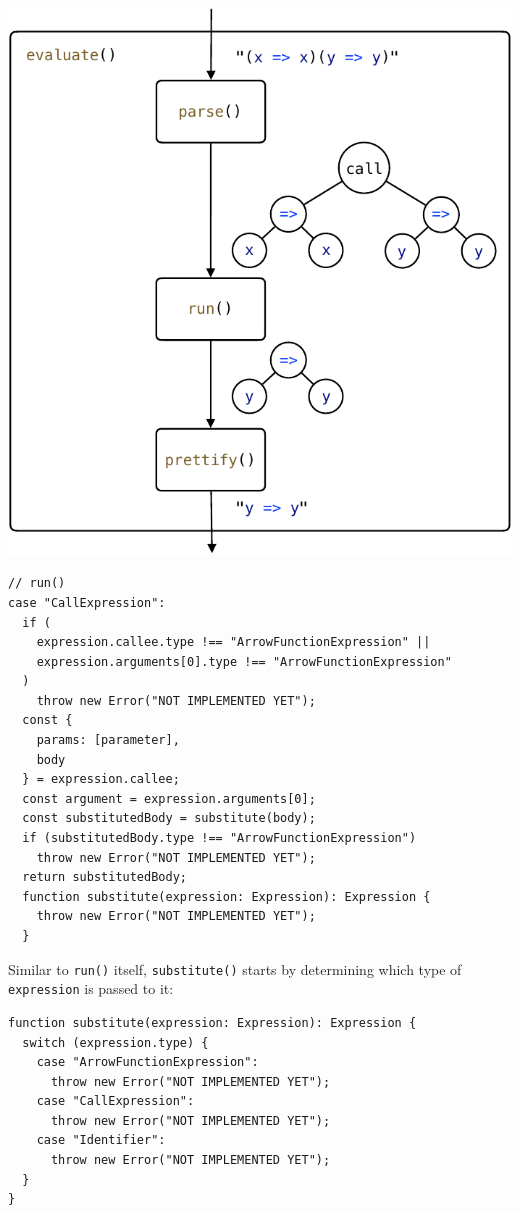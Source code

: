 \documentclass[12pt, oneside]{book}
\begin{document}
\begin{center}
\includegraphics[page = 4]{images.pdf}
\end{center}

\begin{verbatim}
// run()
case "CallExpression":
  if (
    expression.callee.type !== "ArrowFunctionExpression" ||
    expression.arguments[0].type !== "ArrowFunctionExpression"
  )
    throw new Error("NOT IMPLEMENTED YET");
  const {
    params: [parameter],
    body
  } = expression.callee;
  const argument = expression.arguments[0];
  const substitutedBody = substitute(body);
  if (substitutedBody.type !== "ArrowFunctionExpression")
    throw new Error("NOT IMPLEMENTED YET");
  return substitutedBody;
  function substitute(expression: Expression): Expression {
    throw new Error("NOT IMPLEMENTED YET");
  }
\end{verbatim}

Similar to \texttt{run()} itself, \texttt{substitute()} starts by determining which type of \texttt{expression} is passed to it:

\begin{verbatim}
function substitute(expression: Expression): Expression {
  switch (expression.type) {
    case "ArrowFunctionExpression":
      throw new Error("NOT IMPLEMENTED YET");
    case "CallExpression":
      throw new Error("NOT IMPLEMENTED YET");
    case "Identifier":
      throw new Error("NOT IMPLEMENTED YET");
  }
}
\end{verbatim}
\end{document}
